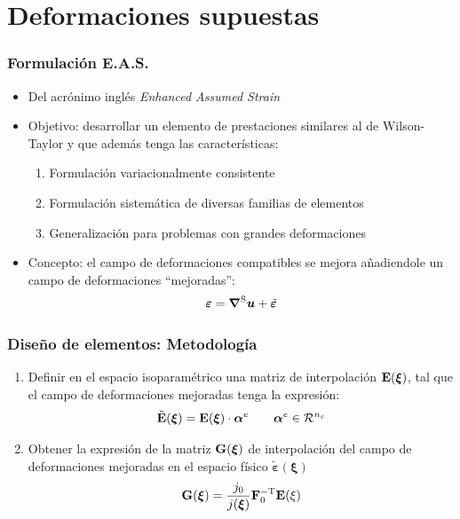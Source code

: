 \documentclass{beamer}
\begin{document}
\section{Deformaciones supuestas}
\begin{frame}
\frametitle{Formulación E.A.S.}
\begin{itemize}
\item Del acrónimo inglés {\em Enhanced Assumed Strain}
\item Objetivo: desarrollar un 
elemento de prestaciones similares al de
Wilson-Taylor y que además tenga las características:
\begin{enumerate}
\item Formulación variacionalmente consistente
\item Formulación sistemática de diversas familias de elementos
\item Generalización para problemas con grandes deformaciones
\end{enumerate}
\item Concepto: el campo de deformaciones compatibles se mejora 
añadiendole un campo de deformaciones ``mejoradas'':
$$\bm{\varepsilon}=\bm{\nabla}^{\rm S}\bm{u}+\tilde{\bm{\varepsilon}}$$
\end{itemize}
\end{frame}
\begin{frame}
\frametitle{Diseño de elementos: Metodología}
\begin{enumerate}
\item Definir en el espacio isoparamétrico una matriz de interpolación 
${\bf E}({\bm \xi})$, tal que el campo de deformaciones mejoradas tenga 
la expresión:
$$
{\tilde {\bf E}}({\bm \xi})={\bf E}({\bm \xi})\cdot {\bm \alpha}^{e}
\qquad {\bm \alpha}^{e} \in {\cal R}^{n_{\varepsilon}}
$$
\item Obtener la expresión de la matriz ${\bf G}({\bm \xi})$ de interpolación
del campo de deformaciones mejoradas en el espacio físico
${\tilde {\bm \varepsilon}}({\bm \xi})$
$$
{\bf G}({\bm \xi})=\frac{j_{0}}{j({\bm \xi})}{\bf F}_{0}^{-{\rm T}}
{\bf E}({\bf \xi}) 
$$
\end{enumerate}
\end{frame}
\end{document}
